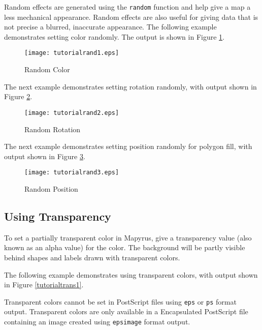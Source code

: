 Random effects are generated using the \texttt{random}
function and help give a map a less mechanical appearance.
Random effects are also useful for giving data that is not
precise a blurred, inaccurate appearance.
The following example demonstrates setting color randomly.
The output is shown in Figure \ref{tutorialrand1}.



\begin{figure}[htb]
\texttt{[image: tutorialrand1.eps]}
\caption{Random Color}
\label{tutorialrand1}
\end{figure}

The next example demonstrates setting rotation randomly, with output shown in
Figure \ref{tutorialrand2}.



\begin{figure}[htb]
\texttt{[image: tutorialrand2.eps]}
\caption{Random Rotation}
\label{tutorialrand2}
\end{figure}

The next example demonstrates setting position randomly for polygon fill, with
output shown in Figure \ref{tutorialrand3}.



\begin{figure}[htb]
\texttt{[image: tutorialrand3.eps]}
\caption{Random Position}
\label{tutorialrand3}
\end{figure}

\subsection{Using Transparency}

To set a partially transparent color in Mapyrus, give a
transparency value (also known as an alpha value) for the color.
The background will be partly visible behind shapes and labels
drawn with transparent colors.

The following example demonstrates using transparent colors, with
output shown in Figure \ref{tutorialtrans1}.

Transparent colors cannot be set in PostScript files using
\texttt{eps} or \texttt{ps}
format output.
Transparent colors are only available in a Encapsulated PostScript file
containing an image created using
\texttt{epsimage}
format output.



